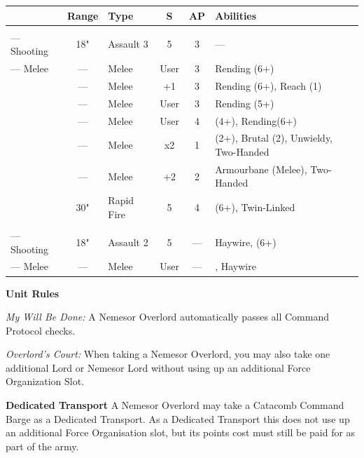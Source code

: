 \begin{minipage}[t]{0.72\textwidth}
	\begin{tabular}{L{90 pt} c C{40pt} *{2}{c} >{\raggedright\arraybackslash}p{130pt}}
		& Range & Type & S & AP & Abilities \\
		\hline
		 & & &  &  &  \\
		— Shooting & 18" & Assault 3 & 5 & 3 & — \\
		— Melee & — & Melee & User & 3 & Rending (6+) \\
		 & — & Melee & +1 & 3 & Rending (6+), Reach (1) \\
		 & — & Melee & User & 3 & Rending (5+) \\
		 & — & Melee & User & 4 &  (4+), Rending(6+) \\
		 & — & Melee & x2 & 1 &  (2+), Brutal (2), Unwieldy, Two-Handed \\
		 & — & Melee & +2 & 2 & Armourbane (Melee), Two-Handed \\
		 & 30" & Rapid Fire & 5 & 4 &  (6+), Twin-Linked \\	
		 & & &  &  &  \\
		— Shooting & 18" & Assault 2 & 5 & — & Haywire,  (6+) \\
		— Melee & — & Melee & User & — & , Haywire \\
	\end{tabular}
	
	\vspace*{2em}
	\textbf{Unit Rules}
	
	\textit{My Will Be Done:} A Nemesor Overlord automatically passes all Command Protocol checks.
	
	\textit{Overlord's Court:} When taking a Nemesor Overlord, you may also take one additional Lord or Nemesor Lord without using up an additional Force Organization Slot. 
	
	\vspace*{2em}
	\textbf{Dedicated Transport}
	A Nemesor Overlord may take a Catacomb Command Barge as a Dedicated Transport. As a Dedicated Transport this does not use up an additional Force Organisation slot, but its points cost must still be paid for as part of the army.
	
\end{minipage}

